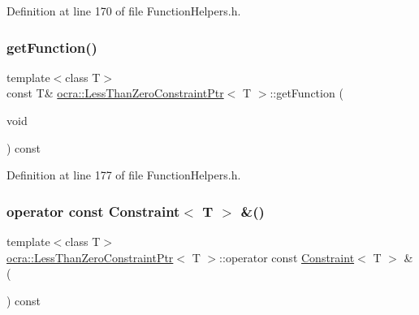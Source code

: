 Definition at line 170 of file Function\+Helpers.\+h.

\hypertarget{classocra_1_1LessThanZeroConstraintPtr_a9b701f6f119d430e6717232fa6a080d4}{}\label{classocra_1_1LessThanZeroConstraintPtr_a9b701f6f119d430e6717232fa6a080d4} 
\subsubsection{\texorpdfstring{get\+Function()}{getFunction()}\hspace{0.1cm}{\footnotesize\ttfamily [2/2]}}
{\footnotesize\ttfamily template$<$class T$>$ \\
const T\& \hyperlink{classocra_1_1LessThanZeroConstraintPtr}{ocra\+::\+Less\+Than\+Zero\+Constraint\+Ptr}$<$ T $>$\+::get\+Function (\begin{DoxyParamCaption}\item[{void}]{ }\end{DoxyParamCaption}) const\hspace{0.3cm}{\ttfamily [inline]}}



Definition at line 177 of file Function\+Helpers.\+h.

\hypertarget{classocra_1_1LessThanZeroConstraintPtr_aaa0683c1982cc4da16c5b17ab2d678f5}{}\label{classocra_1_1LessThanZeroConstraintPtr_aaa0683c1982cc4da16c5b17ab2d678f5} 
\subsubsection{\texorpdfstring{operator const Constraint$<$ T $>$ \&()}{operator const Constraint< T > \&()}}
{\footnotesize\ttfamily template$<$class T$>$ \\
\hyperlink{classocra_1_1LessThanZeroConstraintPtr}{ocra\+::\+Less\+Than\+Zero\+Constraint\+Ptr}$<$ T $>$\+::operator const \hyperlink{classocra_1_1Constraint}{Constraint}$<$ T $>$ \& (\begin{DoxyParamCaption}{ }\end{DoxyParamCaption}) const\hspace{0.3cm}{\ttfamily [inline]}}



